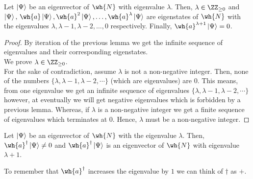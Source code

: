 \documentclass[12pt, a4paper]{article}
\begin{document}
\begin{mdlemma}
    Let \(\ket{\Psi}\) be an eigenvector of \(\wh{N}\) with eigenvalue \(\lambda\). Then, \(\lambda \in \ZZ_{\geq 0}\) and \(\ket{\Psi}, \, \wh{a}\ket{\Psi}, \\\wh{a}^2\ket{\Psi}, \ldots ,  \wh{a}^{\lambda} \ket{\Psi}\) are eigenstates of \(\wh{N}\) with the eigenvalues \(\lambda, \lambda-1,\lambda-2, \ldots, 0\) respectively. Finally, \(\wh{a}^{\lambda+1} \ket{\Psi}=0\).
\end{mdlemma}

\begin{proof}
    By iteration of the previous lemma we get the infinite sequence of eigenvalues and their corresponding eigenstates. \\
    We prove \(\lambda \in \ZZ_{\geq 0}\). \\
    For the sake of contradiction, assume \(\lambda\) is not a non-negative integer. Then, none of the numbers \(\{\lambda,\lambda-1,\lambda-2,\cdots\}\) (which are eigenvalues) are \(0\). This means, from one eigenvalue we get an infinite sequence of eigenvalues \(\{\lambda,\lambda-1,\lambda-2,\cdots\}\) however, at eventually we will get negative eigenvalues which is forbidden by a previous lemma. Whereas, if \(\lambda\) is a non-negative integer we get a finite sequence of eigenvalues which terminates at \(0\). Hence, \(\lambda\) must be a non-negative integer.
\end{proof}

\begin{mdlemma}
    Let \(\ket{\Psi}\) be an eigenvector of \(\wh{N}\) with the eigenvalue \(\lambda\). Then, \(\wh{a}^{\dagger}\ket{\Psi} \neq 0 \) and \(\wh{a}^{\dagger}\ket{\Psi}\) is an eigenvector of \(\wh{N}\) with eigenvalue \(\lambda+1\).
\end{mdlemma}

\begin{mdnote}
    To remember that \({\wh{a}}^{\dagger}\) increases the eigenvalue by \(1\) we can think of \(\dagger\) as \(+\).
\end{mdnote}
\end{document}
